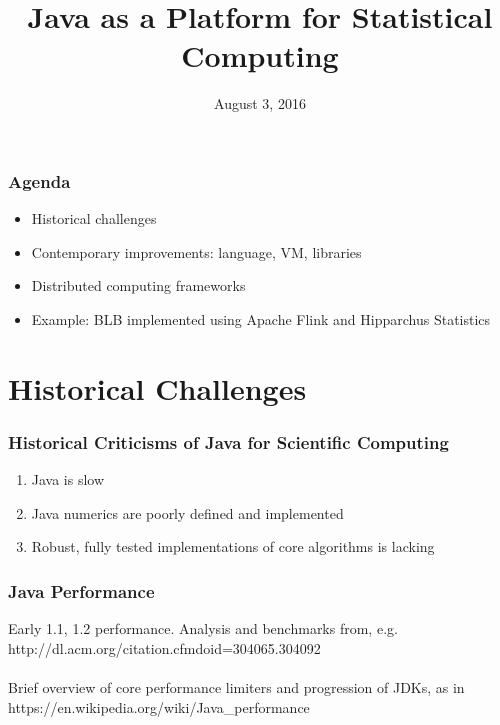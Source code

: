 \documentclass[14pt,mathserif]{beamer}
\title{Java as a Platform for Statistical Computing}
\author{
  \newauthor{Phil Steitz}{phil@steitz.com}
}
\institute[Joint Statistical Meetings]{Joint Statistical Meetings 2016}
\date{August 3, 2016}
\begin{document}
{
\begin{frame} %
  \titlepage
\end{frame}
}

\begin{frame}
  \frametitle{Agenda}
\begin{itemize}
  \item Historical challenges
  \item Contemporary improvements: language, VM, libraries
  \item Distributed computing frameworks
  \item Example: BLB implemented using Apache Flink and Hipparchus Statistics
\end{itemize}

\end{frame}

\section[History]{Historical Challenges}

\begin{frame}
  \frametitle{Historical Criticisms of Java for Scientific Computing}

\begin{enumerate}
  \item Java is slow
  \item Java numerics are poorly defined and implemented
  \item Robust, fully tested implementations of core algorithms is lacking
\end{enumerate}

\end{frame}

\begin{frame}
  \frametitle{Java Performance}
Early 1.1, 1.2 performance. Analysis and benchmarks from, e.g. http://dl.acm.org/citation.cfmdoid=304065.304092
\\
\\
Brief overview of core performance limiters and progression of JDKs, as in
https://en.wikipedia.org/wiki/Java\_performance
\end{frame}
\end{document}

